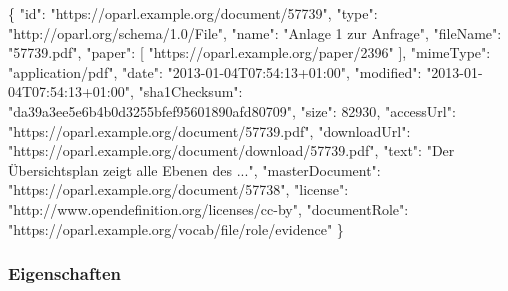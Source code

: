 \documentclass[,a4paper]{article}
\newenvironment{Shaded}{}{}
\newcommand{\DataTypeTok}[1]{\textcolor[rgb]{0.56,0.13,0.00}{{#1}}}
\newcommand{\DecValTok}[1]{\textcolor[rgb]{0.25,0.63,0.44}{{#1}}}
\newcommand{\StringTok}[1]{\textcolor[rgb]{0.25,0.44,0.63}{{#1}}}
\newcommand{\OtherTok}[1]{\textcolor[rgb]{0.00,0.44,0.13}{{#1}}}
\newcommand{\FunctionTok}[1]{\textcolor[rgb]{0.02,0.16,0.49}{{#1}}}
\begin{document}
\begin{Shaded}
\begin{Highlighting}[]
\FunctionTok{\{}
    \DataTypeTok{"id"}\FunctionTok{:} \StringTok{"https://oparl.example.org/document/57739"}\FunctionTok{,}
    \DataTypeTok{"type"}\FunctionTok{:} \StringTok{"http://oparl.org/schema/1.0/File"}\FunctionTok{,}
    \DataTypeTok{"name"}\FunctionTok{:} \StringTok{"Anlage 1 zur Anfrage"}\FunctionTok{,}
    \DataTypeTok{"fileName"}\FunctionTok{:} \StringTok{"57739.pdf"}\FunctionTok{,}
    \DataTypeTok{"paper"}\FunctionTok{:} \OtherTok{[}
        \StringTok{"https://oparl.example.org/paper/2396"}
    \OtherTok{]}\FunctionTok{,}
    \DataTypeTok{"mimeType"}\FunctionTok{:} \StringTok{"application/pdf"}\FunctionTok{,}
    \DataTypeTok{"date"}\FunctionTok{:} \StringTok{"2013-01-04T07:54:13+01:00"}\FunctionTok{,}
    \DataTypeTok{"modified"}\FunctionTok{:} \StringTok{"2013-01-04T07:54:13+01:00"}\FunctionTok{,}
    \DataTypeTok{"sha1Checksum"}\FunctionTok{:} \StringTok{"da39a3ee5e6b4b0d3255bfef95601890afd80709"}\FunctionTok{,}
    \DataTypeTok{"size"}\FunctionTok{:} \DecValTok{82930}\FunctionTok{,}
    \DataTypeTok{"accessUrl"}\FunctionTok{:} \StringTok{"https://oparl.example.org/document/57739.pdf"}\FunctionTok{,}
    \DataTypeTok{"downloadUrl"}\FunctionTok{:} \StringTok{"https://oparl.example.org/document/download/57739.pdf"}\FunctionTok{,}
    \DataTypeTok{"text"}\FunctionTok{:} \StringTok{"Der Übersichtsplan zeigt alle Ebenen des ..."}\FunctionTok{,}
    \DataTypeTok{"masterDocument"}\FunctionTok{:} \StringTok{"https://oparl.example.org/document/57738"}\FunctionTok{,}
    \DataTypeTok{"license"}\FunctionTok{:} \StringTok{"http://www.opendefinition.org/licenses/cc-by"}\FunctionTok{,}
    \DataTypeTok{"documentRole"}\FunctionTok{:} \StringTok{"https://oparl.example.org/vocab/file/role/evidence"}
\FunctionTok{\}}
\end{Highlighting}
\end{Shaded}

\subsubsection{Eigenschaften}\label{eigenschaften-7}
\end{document}
